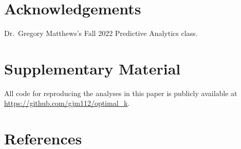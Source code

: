 \documentclass[
  12pt,
]{article}
\begin{document}
\hypertarget{acknowledgements}{%
\section*{Acknowledgements}\label{acknowledgements}}

Dr.~Gregory Matthews's Fall 2022 Predictive Analytics class.

\hypertarget{supplementary-material}{%
\section*{Supplementary Material}\label{supplementary-material}}

All code for reproducing the analyses in this paper is publicly
available at \url{https://github.com/gjm112/optimal_k}.

\hypertarget{references}{%
\section*{References}\label{references}}
\end{document}
